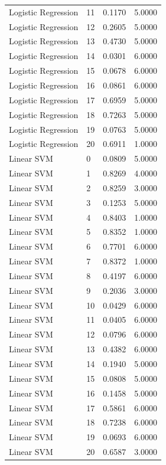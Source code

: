 \begin{tabular}{llll}
Logistic Regression & 11 & 0.1170 & 5.0000 \\
Logistic Regression & 12 & 0.2605 & 5.0000 \\
Logistic Regression & 13 & 0.4730 & 5.0000 \\
Logistic Regression & 14 & 0.0301 & 6.0000 \\
Logistic Regression & 15 & 0.0678 & 6.0000 \\
Logistic Regression & 16 & 0.0861 & 6.0000 \\
Logistic Regression & 17 & 0.6959 & 5.0000 \\
Logistic Regression & 18 & 0.7263 & 5.0000 \\
Logistic Regression & 19 & 0.0763 & 5.0000 \\
Logistic Regression & 20 & 0.6911 & 1.0000 \\
Linear SVM & 0 & 0.0809 & 5.0000 \\
Linear SVM & 1 & 0.8269 & 4.0000 \\
Linear SVM & 2 & 0.8259 & 3.0000 \\
Linear SVM & 3 & 0.1253 & 5.0000 \\
Linear SVM & 4 & 0.8403 & 1.0000 \\
Linear SVM & 5 & 0.8352 & 1.0000 \\
Linear SVM & 6 & 0.7701 & 6.0000 \\
Linear SVM & 7 & 0.8372 & 1.0000 \\
Linear SVM & 8 & 0.4197 & 6.0000 \\
Linear SVM & 9 & 0.2036 & 3.0000 \\
Linear SVM & 10 & 0.0429 & 6.0000 \\
Linear SVM & 11 & 0.0405 & 6.0000 \\
Linear SVM & 12 & 0.0796 & 6.0000 \\
Linear SVM & 13 & 0.4382 & 6.0000 \\
Linear SVM & 14 & 0.1940 & 5.0000 \\
Linear SVM & 15 & 0.0808 & 5.0000 \\
Linear SVM & 16 & 0.1458 & 5.0000 \\
Linear SVM & 17 & 0.5861 & 6.0000 \\
Linear SVM & 18 & 0.7238 & 6.0000 \\
Linear SVM & 19 & 0.0693 & 6.0000 \\
Linear SVM & 20 & 0.6587 & 3.0000 \\
\bottomrule
\end{tabular}
